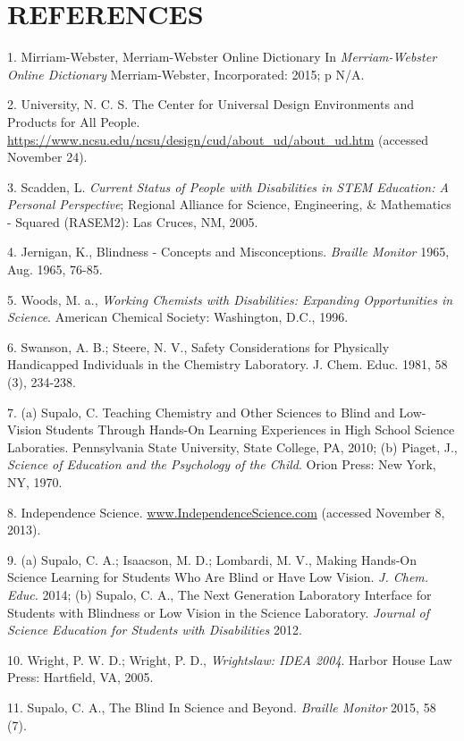 \documentclass[11.5pt]{sig-alternate} %
\begin{document}
\section*{REFERENCES}\par 

\leftskip 0.25in
\parindent -0.25in 
1. Mirriam-Webster, Merriam-Webster Online Dictionary In \textit{Merriam-Webster Online Dictionary} Merriam-Webster, Incorporated: 2015; p N/A.

2. University, N. C. S. The Center for Universal Design Environments and Products for All People. \url{https://www.ncsu.edu/ncsu/design/cud/about_ud/about_ud.htm} (accessed November 24).

3. Scadden, L. \textit{Current Status of People with Disabilities in STEM Education: A Personal Perspective}; Regional Alliance for Science, Engineering, \& Mathematics - Squared (RASEM2): Las Cruces, NM, 2005.

4. Jernigan, K., Blindness - Concepts and Misconceptions. \textit{Braille Monitor} 1965, Aug. 1965, 76-85.

5. Woods, M. a.,\textit{ Working Chemists with Disabilities: Expanding Opportunities in Science}. American Chemical Society: Washington, D.C., 1996.

6. Swanson, A. B.; Steere, N. V., Safety Considerations for Physically Handicapped Individuals in the Chemistry Laboratory. J. Chem. Educ. 1981, 58 (3), 234-238.

7. (a) Supalo, C. Teaching Chemistry and Other Sciences to Blind and Low-Vision Students Through Hands-On Learning Experiences in High School Science Laboraties. Pennsylvania State University, State College, PA, 2010; (b) Piaget, J., \textit{Science of Education and the Psychology of the Child}. Orion Press: New York, NY, 1970.

8. Independence Science. \url{www.IndependenceScience.com} (accessed November 8, 2013).

9. (a) Supalo, C. A.; Isaacson, M. D.; Lombardi, M. V., Making Hands-On Science Learning for Students Who Are Blind or Have Low Vision. \textit{J. Chem. Educ.} 2014; (b) Supalo, C. A., The Next Generation Laboratory Interface for Students with Blindness or Low Vision in the Science Laboratory. \textit{Journal of Science Education for Students with Disabilities} 2012.

10. Wright, P. W. D.; Wright, P. D., \textit{Wrightslaw: IDEA 2004}. Harbor House Law Press: Hartfield, VA, 2005.

11. Supalo, C. A., The Blind In Science and Beyond. \textit{Braille Monitor} 2015, 58 (7).
\end{document}
